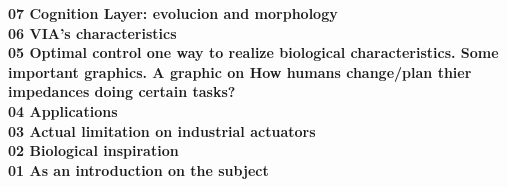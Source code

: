 \documentclass[10pt,onecolumn,twoside,letterpaper]{article}
\begin{document}
{\textbf{07 Cognition Layer: evolucion and morphology}\\ %
\textbf{06 VIA's characteristics}\\ %
\textbf{05 Optimal control one way to realize biological characteristics. Some important graphics. A graphic on How humans change/plan thier impedances doing certain tasks?}\\     
\textbf{04 Applications}\\
\textbf{03 Actual limitation on industrial actuators}\\
\textbf{02 Biological inspiration}\\
\textbf{01 As an introduction on the subject}\\
}\cite{Vanderborght2013}\\
\end{document}
